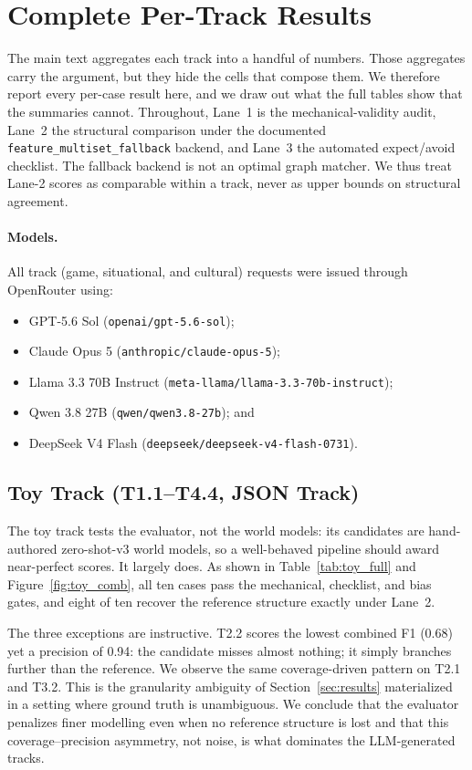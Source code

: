 \documentclass{article}
\begin{document}
\section{Complete Per-Track Results}
\label{app:full_tables}
The main text aggregates each track into a handful of numbers. Those aggregates carry the argument, but they hide the cells that compose them. We therefore report every per-case result here, and we draw out what the full tables show that the summaries cannot. Throughout, Lane~1 is the mechanical-validity audit, Lane~2 the structural comparison under the documented \texttt{feature\_multiset\_fallback} backend, and Lane~3 the automated expect/avoid checklist. The fallback backend is not an optimal graph matcher. We thus treat Lane-2 scores as comparable within a track, never as upper bounds on structural agreement.

  \paragraph{Models.}
  All track (game, situational, and cultural) requests were issued through OpenRouter using:

  \begin{itemize}
      \item GPT-5.6 Sol (\texttt{openai/gpt-5.6-sol});
      \item Claude Opus 5 (\texttt{anthropic/claude-opus-5});
      \item Llama 3.3 70B Instruct (\texttt{meta-llama/llama-3.3-70b-instruct});
      \item Qwen 3.8 27B (\texttt{qwen/qwen3.8-27b}); and
      \item DeepSeek V4 Flash (\texttt{deepseek/deepseek-v4-flash-0731}).
  \end{itemize}
  
\subsection{Toy Track (T1.1--T4.4, JSON Track)}
The toy track tests the evaluator, not the world models: its candidates are hand-authored zero-shot-v3 world models, so a well-behaved pipeline should award near-perfect scores. It largely does. As shown in Table~\ref{tab:toy_full} and Figure~\ref{fig:toy_comb}, all ten cases pass the mechanical, checklist, and bias gates, and eight of ten recover the reference structure exactly under Lane~2.

The three exceptions are instructive. T2.2 scores the lowest combined F1 (0.68) yet a precision of 0.94: the candidate misses almost nothing; it simply branches further than the reference. We observe the same coverage-driven pattern on T2.1 and T3.2. This is the granularity ambiguity of Section~\ref{sec:results} materialized in a setting where ground truth is unambiguous. We conclude that the evaluator penalizes finer modelling even when no reference structure is lost and that this coverage--precision asymmetry, not noise, is what dominates the LLM-generated tracks.
\end{document}

